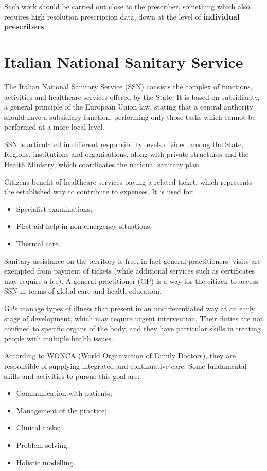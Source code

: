 Such work should be carried out close to the prescriber, something which also requires high resolution prescription data, down at the level of \textbf{individual prescribers}.

\section{Italian National Sanitary Service}
The Italian National Sanitary Service (SSN) consists the complex of functions, activities and healthcare services offered by the State. It is based on subsidiarity, a general principle of the European Union law, stating that a central authority should have a subsidiary function, performing only those tasks which cannot be performed at a more local level\cite{oxford}.

SSN is articulated in different responsibility levels divided among the State, Regions, institutions and organisations, along with private structures and the Health Ministry, which coordinates the national sanitary plan.

Citizens benefit of healthcare services paying a related ticket\cite{ticket}, which represents the established way to contribute to expenses. It is used for:
\begin{itemize}
	\item Specialist examinations;
	\item First-aid help in non-emergency situations;
	\item Thermal care.
\end{itemize}

Sanitary assistance on the territory is free, in fact general practitioners' visits are exempted from payment of tickets (while additional services such as certificates may require a fee). A general practitioner (GP) is a way for the citizen to access SSN in terms of global care and health education.

GPs manage types of illness that present in an undifferentiated way at an early stage of development, which may require urgent intervention. Their duties are not confined to specific organs of the body, and they have particular skills in treating people with multiple health issues\cite{wonca2}. 

According to WONCA (World Organization of Family Doctors), they are responsible of supplying integrated and continuative care. Some fundamental skills and activities\cite{wonca2} to pursue this goal are:
\begin{itemize}
	\item Communication with patients;
	\item Management of the practice;
	\item Clinical tasks;
	\item Problem solving;
	\item Holistic modelling.
\end{itemize}

